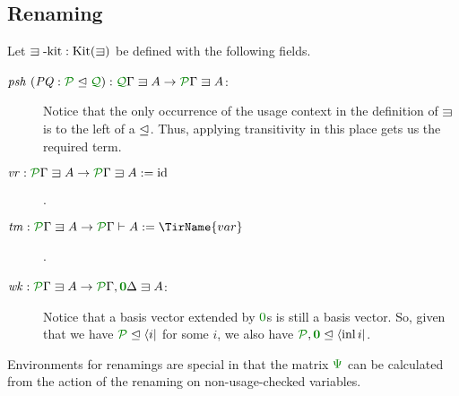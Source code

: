 \documentclass[submission,copyright,creativecommons]{eptcs}
\begin{document}
\subsection{Renaming}

\begin{definition}\label{def:lvar-kit}
  Let $\lvar\textrm{-kit} : \kit(\lvar)$ be defined with the following
  fields.
  \begin{description}
    \item[$\mathit{psh}~(\mathit{PQ} : \resctx P \subres \resctx Q)
      : \ctx{\Gamma}{Q} \lvar A \to \ctx{\Gamma}{P} \lvar A$:]
      Notice that the only occurrence of the usage context in the definition of
      $\lvar$ is to the left of a $\trianglelefteq$.
      Thus, applying transitivity in this place gets us the required term.
    \item[$\mathit{vr} : \ctx{\Gamma}{P} \lvar A \to \ctx{\Gamma}{P} \lvar A
      := \mathrm{id}$].
    \item[$\mathit{tm} : \ctx{\Gamma}{P} \lvar A \to \ctx{\Gamma}{P} \vdash A
      := \TirName{var}$].
    \item[$\mathit{wk} : \ctx{\Gamma}{P} \lvar A
      \to \ctx{\Gamma}{P}, \ctx{\Delta}{\vct 0} \lvar A$:]
      Notice that a basis vector extended by $\rescomment 0$s is still a basis
      vector.
      So, given that we have $\resctx P \subres \langle i \rvert$ for some $i$,
      we also have
      $\resctx P, \rescomment{\vct 0} \subres \langle \inl i \rvert$.
  \end{description}
\end{definition}

Environments for renamings are special in that the matrix $\rescomment\Psi$ can
be calculated from the action of the renaming on non-usage-checked variables.
\end{document}
